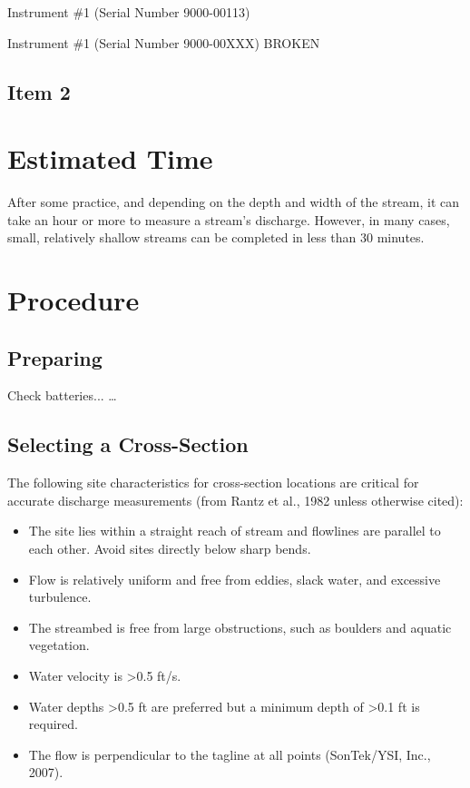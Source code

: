 \documentclass[12pt]{../SOP3_beta}\usepackage[]{graphicx}\usepackage[]{xcolor}
\begin{document}
\NP Instrument \#1 (Serial Number 9000-00113)

\NP Instrument \#1 (Serial Number 9000-00XXX) BROKEN

\subsection{Item 2}

\section{Estimated Time}

\NP After some practice, and depending on the depth and width of the stream, it can take an hour or more to measure a stream's discharge. However, in many cases, small, relatively shallow streams can be completed in less than 30 minutes. 

\section{Procedure}

\subsection{Preparing}

\NP Check batteries... \dots


\subsection{Selecting a Cross-Section}

\NP The following site characteristics for cross-section locations are critical for accurate
discharge measurements (from Rantz et al., 1982 unless otherwise cited):

\begin{itemize}
\item The site lies within a straight reach of stream and flowlines are parallel to each
other. Avoid sites directly below sharp bends.

\item Flow is relatively uniform and free from eddies, slack water, and excessive
turbulence.

\item The streambed is free from large obstructions, such as boulders and aquatic
vegetation.

\item Water velocity is >0.5 ft/s.

\item Water depths >0.5 ft are preferred but a minimum depth of >0.1 ft is required.

\item The flow is perpendicular to the tagline at all points (SonTek/YSI, Inc., 2007).

\end{itemize}
\end{document}
